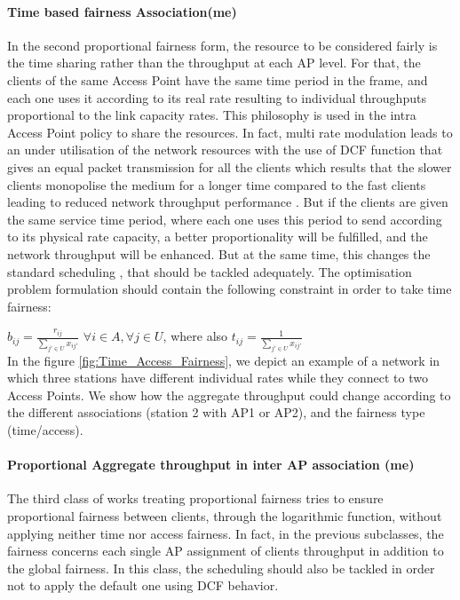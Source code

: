 \documentclass[journal,transmag]{IEEEtran}
\begin{document}
\paragraph{Time based fairness Association(me)}
In the second proportional fairness form, the resource to be considered fairly is the time sharing rather than the throughput at each AP level. For that, the clients of the same Access Point have the same time period in the frame, and each one uses it according to its real rate resulting to individual throughputs proportional to the link capacity rates. This philosophy is used in the intra Access Point policy to share the resources. In fact, multi rate modulation leads to an under utilisation of the network resources with the use of DCF function that gives an equal packet transmission for all the clients which results that the slower clients monopolise the medium for a longer time compared to the fast clients leading to reduced network throughput performance \cite{08proportional_fairness_multiRate_LAN,16rigourous_practical_proportional_fair_AP}. But if the clients are given the same service time period, where each one uses this period to send according to its physical rate capacity, a better proportionality will be fulfilled, and the network throughput will be enhanced. But at the same time, this changes the standard scheduling \cite{16AP_association_optimisation_fairness}, that should be tackled adequately. The optimisation problem formulation should contain the following constraint in order to take time fairness:

$ b_{ij} = \frac{r_{ij}}{\sum\limits_{j' \in U} x_{ij'}}$  $\forall i \in A, \forall j \in U $, where also $ t_{ij} = \frac{1}{\sum\limits_{j' \in U} x_{ij'}}$ \\

In the figure \ref{fig:Time_Access_Fairness}, we depict an example of a network in which three stations have different individual rates while they connect to two Access Points. We show how the aggregate throughput could change according to the different associations (station 2 with AP1 or AP2), and the fairness type (time/access).

\paragraph{Proportional Aggregate throughput in inter AP association (me)}
The third class of works treating proportional fairness tries to ensure proportional fairness between clients, through the logarithmic function, without applying neither time nor access fairness. In fact, in the previous subclasses, the fairness concerns each single AP assignment of clients throughput in addition to the global fairness. In this class, the scheduling should also be tackled in order not to apply the default one using DCF behavior. 
\end{document}
